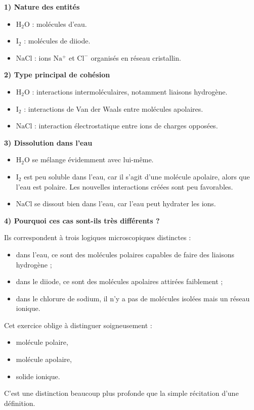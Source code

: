 \documentclass[11pt,a4paper]{article}
\begin{document}
\begin{corrigebox}
\textbf{1) Nature des entités}

\begin{itemize}
    \item \(\mathrm{H_2O}\) : molécules d'eau.
    \item \(\mathrm{I_2}\) : molécules de diiode.
    \item \(\mathrm{NaCl}\) : ions \(\mathrm{Na^+}\) et \(\mathrm{Cl^-}\) organisés en réseau cristallin.
\end{itemize}

\textbf{2) Type principal de cohésion}

\begin{itemize}
    \item \(\mathrm{H_2O}\) : interactions intermoléculaires, notamment liaisons hydrogène.
    \item \(\mathrm{I_2}\) : interactions de Van der Waals entre molécules apolaires.
    \item \(\mathrm{NaCl}\) : interaction électrostatique entre ions de charges opposées.
\end{itemize}

\textbf{3) Dissolution dans l'eau}

\begin{itemize}
    \item \(\mathrm{H_2O}\) se mélange évidemment avec lui-même.
    \item \(\mathrm{I_2}\) est peu soluble dans l'eau, car il s'agit d'une molécule apolaire, alors que l'eau est polaire. Les nouvelles interactions créées sont peu favorables.
    \item \(\mathrm{NaCl}\) se dissout bien dans l'eau, car l'eau peut hydrater les ions.
\end{itemize}

\textbf{4) Pourquoi ces cas sont-ils très différents ?}

Ils correspondent à trois logiques microscopiques distinctes :
\begin{itemize}
    \item dans l'eau, ce sont des molécules polaires capables de faire des liaisons hydrogène ;
    \item dans le diiode, ce sont des molécules apolaires attirées faiblement ;
    \item dans le chlorure de sodium, il n'y a pas de molécules isolées mais un réseau ionique.
\end{itemize}

\begin{bilanbox}
Cet exercice oblige à distinguer soigneusement :
\begin{itemize}
    \item molécule polaire,
    \item molécule apolaire,
    \item solide ionique.
\end{itemize}
C'est une distinction beaucoup plus profonde que la simple récitation d'une définition.
\end{bilanbox}
\end{corrigebox}
\end{document}
